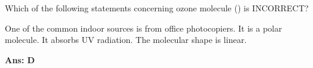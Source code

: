 \documentclass[border=3pt,varwidth=70mm]{standalone}
\begin{document}
Which of the following statements concerning ozone molecule () is INCORRECT? 

\begin{choices}
\choice One of the common indoor sources is from office photocopiers.
\choice It is a polar molecule.
\choice It absorbs UV radiation.
\choice The molecular shape is linear.
\end{choices}


\begin{answer}
\hrulefill\par
\textbf{Ans: D}

\end{answer}
\end{document}
